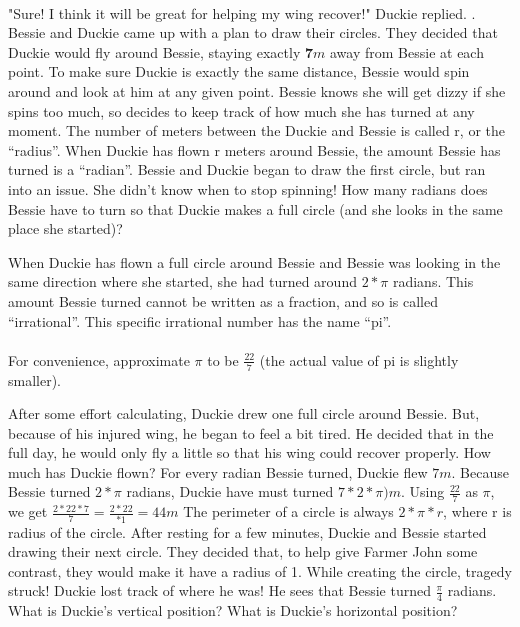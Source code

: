 \paragraph{} "Sure! I think it will be great for helping my wing recover!" Duckie replied.
\vfill.
\pagebreak
{}
{Bessie and Duckie came up with a plan to draw their circles. They decided that Duckie would fly around Bessie, staying exactly $\mathbf{7} m$ away from Bessie at each point. To make sure Duckie is exactly the same distance, Bessie would spin around and look at him at any given point. Bessie knows she will get dizzy if she spins too much, so decides to keep track of how much she has turned at any moment.}
{}
{The number of meters between the Duckie and Bessie is called r, or the “radius”. When Duckie has flown r meters around Bessie, the amount Bessie has turned is a “radian”.}
{}
{Bessie and Duckie began to draw the first circle, but ran into an issue. She didn't know when to stop spinning! How many radians does Bessie have to turn so that Duckie makes a full circle (and she looks in the same place she started)?}
{}
{When Duckie has flown a full circle around Bessie and Bessie was looking in the same direction where she started, she had turned around $2\ast\pi$ radians. This amount Bessie turned cannot be written as a fraction, and so is called “irrational”. This specific irrational number has the name “pi”. 
\paragraph{} For convenience, approximate $\pi$ to be $\frac{22}{7}$ (the actual value of pi is slightly smaller).}
{}
{After some effort calculating, Duckie drew one full circle around Bessie. But, because of his injured wing, he began to feel a bit tired. He decided that in the full day, he would only fly a little so that his wing could recover properly. How much has Duckie flown?}
{For every radian Bessie turned, Duckie flew $7 m$. Because Bessie turned $2\ast \pi$ radians, Duckie have must turned $7\ast 2\ast\pi) m$. Using $\frac{22}{7}$ as $\pi$, we get $\frac{2\ast 22\ast 7}{7}=\frac{2\ast 22}{\ast 1}=44 m$}
{The perimeter of a circle is always $2\ast\pi\ast r$, where r is radius of the circle.}
{}
{After resting for a few minutes, Duckie and Bessie started drawing their next circle. They decided that, to help give Farmer John some contrast, they would make it have a radius of 1. While creating the circle, tragedy struck! Duckie lost track of where he was! He sees that Bessie turned $\frac{\pi}{4}$ radians. What is Duckie's vertical position? What is Duckie's horizontal position?}
